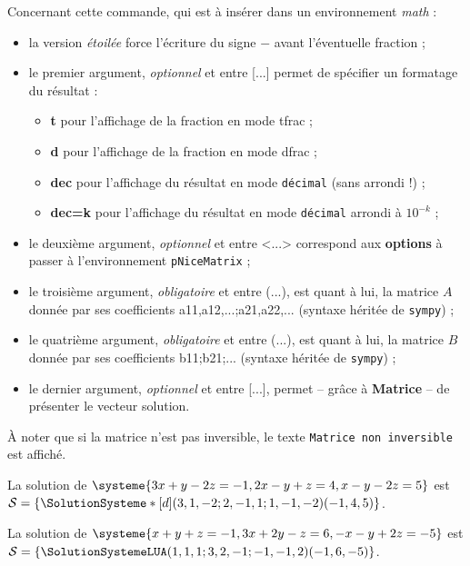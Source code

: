 \documentclass[a4paper,11pt]{article}
\newcommand\Cle[1]{{\bfseries\sffamily\textlangle #1\textrangle}}
\begin{document}
Concernant cette commande, qui est à insérer dans un environnement \textit{math} :

\begin{itemize}
	\item la version \textit{étoilée} force l'écriture du signe \og $-$ \fg{} avant l'éventuelle fraction ;
	\item le premier argument, \textit{optionnel} et entre \textsf{[...]} permet de spécifier un formatage du résultat :
	\begin{itemize}
		\item \Cle{t} pour l'affichage de la fraction en mode \textsf{tfrac} ;
		\item \Cle{d} pour l'affichage de la fraction en mode \textsf{dfrac} ;
		\item \Cle{dec} pour l'affichage du résultat en mode \texttt{décimal} (sans arrondi !) ;
		\item \Cle{dec=k} pour l'affichage du résultat en mode \texttt{décimal} arrondi à $10^{-k}$ ;
	\end{itemize}
	\item le deuxième argument, \textit{optionnel} et entre \textsf{<...>} correspond aux \Cle{options} à passer à l'environnement \texttt{pNiceMatrix} ;
	\item le troisième argument, \textit{obligatoire} et entre \textsf{(...)}, est quant à lui, la matrice $A$ donnée par ses coefficients \textsf{a11,a12,...;a21,a22,...} (syntaxe héritée de \texttt{sympy}) ;
	\item le quatrième argument, \textit{obligatoire} et entre \textsf{(...)}, est quant à lui, la matrice $B$ donnée par ses coefficients \textsf{b11;b21;...} (syntaxe héritée de \texttt{sympy}) ;
	\item le dernier argument, \textit{optionnel} et entre \textsf{[...]}, permet -- grâce à \Cle{Matrice} -- de présenter le vecteur solution.
\end{itemize}

À noter que si la matrice n'est pas inversible, le texte \texttt{Matrice non inversible} est affiché.

\begin{PresentationCode}{}
La solution de $\systeme{3x+y-2z=-1,2x-y+z=4,x-y-2z=5}$ est $\mathcal{S}=%
\left\lbrace \SolutionSysteme*[d](3,1,-2;2,-1,1;1,-1,-2)(-1,4,5) \right\rbrace$.\\
\end{PresentationCode}

\begin{PresentationCode}{}
La solution de $\systeme{x+y+z=-1,3x+2y-z=6,-x-y+2z=-5}$ est $\mathcal{S}=%
\left\lbrace \SolutionSystemeLUA(1,1,1;3,2,-1;-1,-1,2)(-1,6,-5) \right\rbrace$.
\end{PresentationCode}
\end{document}

